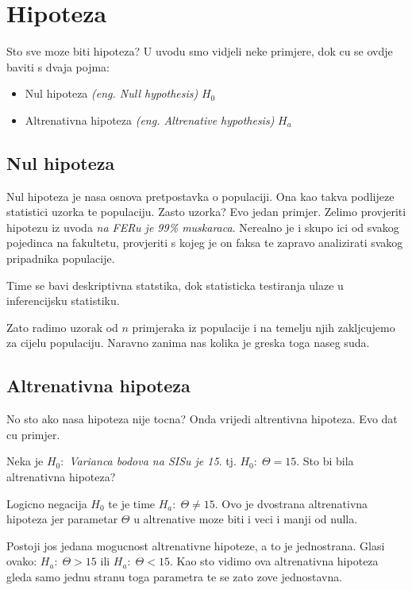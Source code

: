 \chapter{Hipoteza}
Sto sve moze biti hipoteza? U uvodu smo vidjeli neke primjere, dok cu se ovdje baviti s dvaja pojma: 

\begin{itemize}
	\item Nul hipoteza \textit{(eng. Null hypothesis)} $H_0$
	\item Altrenativna hipoteza \textit{(eng. Altrenative hypothesis)} $H_a$
\end{itemize}

\section{Nul hipoteza}
Nul hipoteza je nasa osnova pretpostavka o populaciji. Ona kao takva podlijeze statistici uzorka te populaciju. Zasto uzorka? Evo jedan primjer. Zelimo provjeriti hipotezu iz uvoda \emph{na FERu je 99\% muskaraca}. Nerealno je i skupo ici od svakog pojedinca na fakultetu, provjeriti s kojeg je on faksa te zapravo analizirati svakog pripadnika populacije. 

Time se bavi deskriptivna statstika, dok statisticka testiranja ulaze u inferencijsku statistiku. 

Zato radimo uzorak od $n$ primjeraka iz populacije i na temelju njih zakljcujemo za cijelu populaciju. Naravno zanima nas kolika je greska toga naseg suda.

\section{Altrenativna hipoteza}
No sto ako nasa hipoteza nije tocna? Onda vrijedi altrentivna hipoteza. Evo dat cu primjer. 

Neka je $H_0:$ \emph{Varianca bodova na SISu je 15}. tj. $H_0:\; \Theta = 15$. Sto bi bila altrenativna hipoteza? 

Logicno negacija $H_0$ te je time $H_a:\; \Theta \ne 15$. Ovo je dvostrana altrenativna hipoteza jer parametar $\Theta$ u altrenative moze biti i veci i manji od nulla. 

Postoji jos jedana mogucnost altrenativne hipoteze, a to je jednostrana. Glasi ovako: $H_a:\; \Theta > 15$ ili $H_a:\; \Theta < 15$. Kao sto vidimo ova altrenativna hipoteza gleda samo jednu stranu toga parametra te se zato zove jednostavna. 


